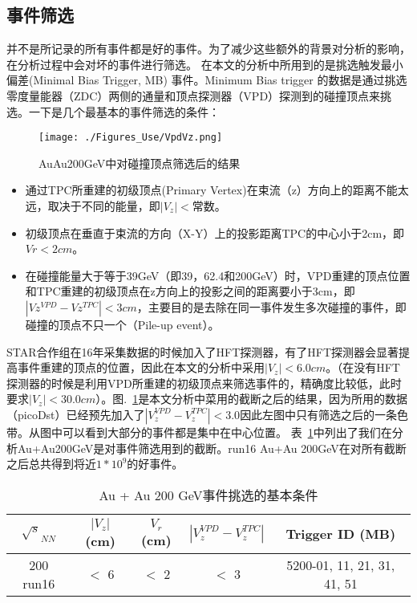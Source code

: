 \subsection{事件筛选}
并不是所记录的所有事件都是好的事件。为了减少这些额外的背景对分析的影响，在分析过程中会对坏的事件进行筛选。
在本文的分析中所用到的是挑选触发最小偏差(Minimal Bias Trigger, MB) 事件。Minimum Bias trigger 的数据是通过挑选零度量能器（ZDC）两侧的通量和顶点探测器（VPD）探测到的碰撞顶点来挑选。一下是几个最基本的事件筛选的条件：
\begin{figure}[htbp]
\centering
\texttt{[image: ./Figures\_Use/VpdVz.png]}
\caption{AuAu200GeV中对碰撞顶点筛选后的结果}
\label{Fig:VpdVz}
\end{figure}

\begin{itemize}
\item 通过TPC所重建的初级顶点(Primary Vertex)在束流（z）方向上的距离不能太远，取决于不同的能量，即$|V_z| < $常数。
\item 初级顶点在垂直于束流的方向（X-Y）上的投影距离TPC的中心小于2cm，即$Vr < 2 cm$。
\item 在碰撞能量大于等于39GeV（即39，62.4和200GeV）时，VPD重建的顶点位置和TPC重建的初级顶点在z方向上的投影之间的距离要小于3cm，即 $|Vz^{VPD}-Vz^{TPC}| < 3cm$，主要目的是去除在同一事件发生多次碰撞的事件，即碰撞的顶点不只一个（Pile-up event）。
\end{itemize}
STAR合作组在16年采集数据的时候加入了HFT探测器，有了HFT探测器会显著提高事件重建的顶点的位置，因此在本文的分析中采用$|V_z| < 6.0   cm$。（在没有HFT探测器的时候是利用VPD所重建的初级顶点来筛选事件的，精确度比较低，此时要求$|V_z| < 30.0 cm$）。图.~\ref{Fig:VpdVz}是本文分析中菜用的截断之后的结果，因为所用的数据（picoDst）已经预先加入了$|V_{z}^{VPD}-V_{z}^{TPC}| < 3.0$因此左图中只有筛选之后的一条色带。从图中可以看到大部分的事件都是集中在中心位置。
表~\ref{tab:Event_cut}中列出了我们在分析Au+Au200GeV是对事件筛选用到的截断。run16 Au+Au 200GeV在对所有截断之后总共得到将近$1*10^{9}$的好事件。
\begin{table}[htb]
\centering
\caption{Au + Au 200 GeV事件挑选的基本条件}
\begin{tabular}{c|c|c|c|c}
\toprule
$\sqrt{s}_{NN}$  &  $|V_{z}|$(cm)  &  $V_{r}$(cm)  &  $|V_{z}^{VPD}-V_{z}^{TPC}|$  &  Trigger ID (MB)                          \\ \hline
200 run16       &  $<$ 6          &  $<$ 2        &  $<$ 3                        &       5200-01, 11, 21, 31, 41, 51    \\ 
\bottomrule
\end{tabular}
\label{tab:Event_cut}
\end{table}

